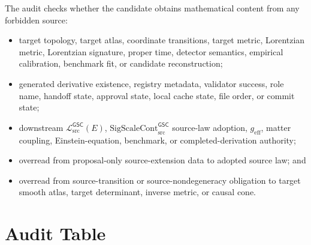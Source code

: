 \documentclass[11pt]{article}
\newcommand{\MetricData}{\mathcal{L}_{\mathrm{src}}^{\mathsf{GSC}}}
\newcommand{\geff}{g_{\mathrm{eff}}}
\newcommand{\SigScaleCont}{\mathrm{SigScaleCont}_{\mathrm{src}}^{\mathsf{GSC}}}
\begin{document}
The audit checks whether the candidate obtains mathematical content from any
forbidden source:

\begin{itemize}[leftmargin=*]
  \item target topology, target atlas, coordinate transitions, target metric,
  Lorentzian metric, Lorentzian signature, proper time, detector semantics,
  empirical calibration, benchmark fit, or candidate reconstruction;
  \item generated derivative existence, registry metadata, validator success,
  role name, handoff state, approval state, local cache state, file order, or
  commit state;
  \item downstream \(\MetricData(E)\), \(\SigScaleCont\) source-law adoption,
  \(\geff\), matter coupling, Einstein-equation, benchmark, or
  completed-derivation authority;
  \item overread from proposal-only source-extension data to adopted source
  law; and
  \item overread from source-transition or source-nondegeneracy obligation to
  target smooth atlas, target determinant, inverse metric, or causal cone.
\end{itemize}

\section{Audit Table}
\end{document}
